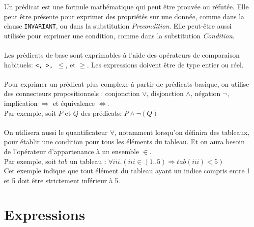 Un prédicat est une formule mathématique qui peut être prouvée ou
réfutée. Elle peut être présente pour exprimer des propriétés sur une
donnée, comme dans la clause \texttt{INVARIANT}, ou dans la substitution
\emph{Precondition}. Elle peut-être aussi utilisée pour exprimer une
condition, comme dans la substitution \emph{Condition}.

\paragraph{}
Les prédicats de base sont exprimables à l'aide des opérateurs de
comparaison habituels: \texttt{<, >, $\leq$}, et \texttt{$\geq$}. Les expressions doivent
être de type entier ou réel.

\paragraph{}
Pour exprimer un prédicat plus complexe à partir de prédicats basique,
on utilise des connecteurs propositionnels : conjonction \texttt{$\vee$},
disjonction \texttt{$\wedge$}, négation \texttt{$\neg$}, implication
\texttt{$\Rightarrow$} et équivalence \texttt{$\Leftrightarrow$}.\\
Par exemple, soit $P$ et $Q$ des prédicats: $P\wedge\neg(Q)$

\paragraph{}
On utilisera aussi le quantificateur $\forall$, notamment lorsqu'on
définira des tableaux, pour établir une condition pour tous les
éléments du tableau. Et on aura besoin de l'opérateur d'appartenance à
un ensemble $\in$.\\
Par exemple, soit $tab$ un tableau : $\forall iii . (iii \in (1..5)
\Rightarrow tab(iii) < 5)$\\
Cet exemple indique que tout élément du tableau ayant un indice compris
entre 1 et 5 doit être strictement inférieur à 5. 




\section{Expressions}

